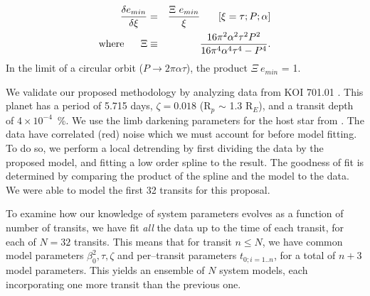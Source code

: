 \begin{eqnarray}
\frac{\delta e_{min}}{\delta \xi} & = & \frac{\Xi~e_{min}}{\xi} ~~~~~ \left[\xi = \tau; P; \alpha \right] \\
{\rm where}~~~~~\Xi & \equiv & \frac{16 \pi^{2} \alpha^{2} \tau^{2} P^{2}}{16 \pi^{4} \alpha^{4} \tau^{4} - P^{4}}.\nonumber
\label{eq-emin3}
\end{eqnarray}
In the limit of a circular orbit ($P \rightarrow 2 \pi \alpha \tau$),
the product $\Xi~e_{min}$ = 1.

\medskip
{\centerline{}}
\smallskip

We validate our proposed methodology by analyzing \kepler data from KOI
701.01 \citep[Kepler 62--b;][]{2013arXiv1304.7387B}.  This planet has
a period of 5.715 days, $\zeta = 0.018$ (R$_p$ $\sim$ 1.3 R$_E$), and
a transit depth of $4 \times 10^{-4}$~\%.  We use the limb darkening
parameters for the host star from
\cite{2010A&A...510A..21S}.  The \kepler data have correlated (red) noise
which we must account for before model fitting.  To do so, we perform
a local detrending by first dividing the data by the proposed model,
and fitting a low order spline to the result.  The goodness of fit is
determined by comparing the product of the spline and the model to the
data.  We were able to model the first 32 transits for this
proposal.



To examine how our knowledge of system parameters evolves as a
function of number of transits, we have fit {\it all} the data up to
the time of each transit, for each of $N = 32$ transits.  This means
that for transit $n \leq N$, we have common model parameters
$\beta_{0}^2, \tau, \zeta$ and per--transit parameters $t_{0;i=1..n}$,
for a total of $n+3$ model parameters.  This yields an ensemble of $N$
system models, each incorporating one more transit than the previous
one.

